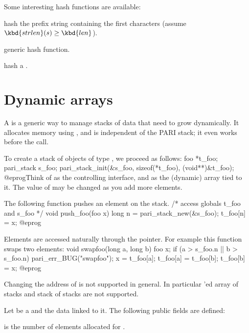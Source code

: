 Some interesting hash functions are available:


 hash the prefix string
containing the first  characters (assume $\kbd{strlen}(s) \geq
\kbd{len}$).

 generic hash function.

 hash a .

\section{Dynamic arrays}

A  is a generic way to manage stacks of data that need
to grow dynamically. It allocates memory using , and is
independent of the PARI stack; it even works before the  call.


To create a stack of objects of type , we proceed as follows:
\bprog
foo *t_foo;
pari_stack s_foo;
pari_stack_init(&s_foo, sizeof(*t_foo), (void**)&t_foo);
@eprog\noindent Think of  as the controlling interface, and
 as the (dynamic) array tied to it. The value of 
may be changed as you add more elements.

The following function pushes an element on the stack.
\bprog
/* access globals t_foo and s_foo */
void push_foo(foo x)
{
  long n = pari_stack_new(&s_foo);
  t_foo[n] = x;
}
@eprog


Elements are accessed naturally through the  pointer.
For example this function swaps two elements:
\bprog
void swapfoo(long a, long b)
{
  foo x;
  if (a > s_foo.n || b > s_foo.n) pari_err_BUG("swapfoo");
  x        = t_foo[a];
  t_foo[a] = t_foo[b];
  t_foo[b] = x;
}
@eprog

Changing the address of  is not supported in general.
In particular 'ed array of stacks and stack of stacks are not
supported.

Let  be a  and  the data linked to it. The
following public fields are defined:

\item {} is the number of elements allocated for .

